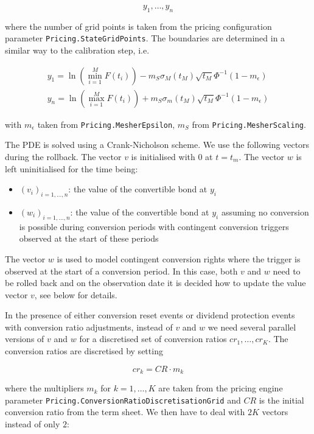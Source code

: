 {\begin{equation}
  y_1, \ldots, y_n
\end{equation}

where the number of grid points is taken from the pricing configuration parameter \verb+Pricing.StateGridPoints+. The
boundaries are determined in a similar way to the calibration step, i.e.

\begin{eqnarray}
y_1 = \ln \left( \min_{i=1}^M F(t_i) \right) - m_S \sigma_M(t_M)\sqrt{t_M} \Phi^{-1}(1 - m_\epsilon) \\
y_n = \ln \left( \max_{i=1}^M F(t_i) \right) + m_S \sigma_m(t_M)\sqrt{t_M} \Phi^{-1}(1 - m_\epsilon)
\end{eqnarray}

with $m_\epsilon$ taken from \verb+Pricing.MesherEpsilon+, $m_S$ from \verb+Pricing.MesherScaling+.

The PDE is solved using a Crank-Nicholson scheme. We use the following vectors during the rollback. The vector $v$ is
initialised with $0$ at $t=t_m$. The vector $w$ is left uninitialised for the time being:

\begin{itemize}
\item $(v_i)_{i=1,\ldots,n}$: the value of the convertible bond at $y_i$
\item $(w_i)_{i=1,\ldots,n}$: the value of the convertible bond at $y_i$ assuming no conversion is possible during
  conversion periods with contingent conversion triggers observed at the start of these periods
\end{itemize}

The vector $w$ is used to model contingent conversion rights where the trigger is observed at the start of a conversion
period. In this case, both $v$ and $w$ need to be rolled back and on the observation date it is decided how to update
the value vector $v$, see below for details.

In the presence of either conversion reset events or dividend protection events with conversion ratio adjustments,
instead of $v$ and $w$ we need several parallel versions of $v$ and $w$ for a discretised set of conversion ratios
$cr_1,\ldots,cr_K$. The conversion ratios are discretised by setting

\begin{equation}
  cr_k = CR \cdot m_k
\end{equation}

where the multipliers $m_k$ for $k=1,\ldots,K$ are taken from the pricing engine parameter
\verb+Pricing.ConversionRatioDiscretisationGrid+ and $CR$ is the initial conversion ratio from the term sheet. We then
have to deal with $2K$ vectors instead of only $2$:

}
